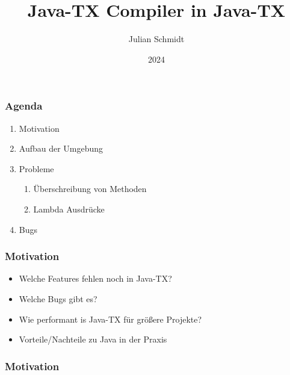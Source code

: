 \documentclass{beamer}
\title{Java-TX Compiler in Java-TX}
\author{Julian Schmidt}
\institute{DHBW Stuttgart}
\date{2024}
\begin{document}
\maketitle

\begin{frame}
\frametitle{Agenda}
\begin{enumerate}
    \item Motivation
    \item Aufbau der Umgebung
    \item Probleme
    \begin{enumerate}
        \item Überschreibung von Methoden
        \item Lambda Ausdrücke
    \end{enumerate}
    \item Bugs
\end{enumerate}
\end{frame}

\begin{frame}
\frametitle{Motivation}

\begin{itemize}
    \item Welche Features fehlen noch in Java-TX?
    \item Welche Bugs gibt es?
    \item Wie performant is Java-TX für größere Projekte?
    \item Vorteile/Nachteile zu Java in der Praxis
\end{itemize}

\end{frame}

\begin{frame}
    \frametitle{Motivation}
    \begin{center}
\end{center}
\end{frame}
\end{document}
